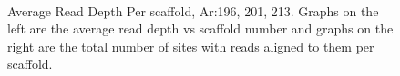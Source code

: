 \documentclass[../main.tex]{subfiles}
\begin{document}
\begin{figure}[H]
\begin{centering}
		\\
		\begin{singlespace}
			\vspace{-0.5cm}		
			\caption[Average Read Depth Per scaffold, Ar:196, 201, 213]{Average Read Depth Per scaffold, Ar:196, 201, 213. Graphs on the left are the average read depth vs scaffold number and graphs on the right are the total number of sites with reads aligned to them per scaffold.}\label{avg_rd_graphs_5}
		\end{singlespace}	
	\end{centering}
\end{figure}
\newpage
\end{document}
